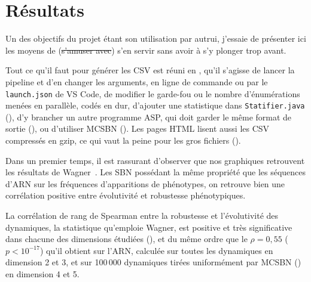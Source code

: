 \documentclass[12pt, a4paper]{article}
\begin{document}
\section{Résultats}
\label{sec:observations}

Un des objectifs du projet étant son utilisation par autrui, j'essaie de présenter ici les moyens de (\sout{s'amuser avec}) s'en servir sans avoir à s'y plonger trop avant. 

Tout ce qu'il faut pour générer les CSV est réuni en , qu'il s'agisse de lancer la pipeline et d'en changer les arguments, en ligne de commande ou par le \texttt{launch.json} de VS Code, de modifier le garde-fou ou le nombre d'énumérations menées en parallèle, codés en dur, d'ajouter une statistique dans \texttt{Statifier.java} (), d'y brancher un autre programme ASP, qui doit garder le même format de sortie (), ou d'utiliser MCSBN ().
Les pages HTML lisent aussi les CSV compressés en gzip, ce qui vaut la peine pour les gros fichiers ().


Dans un premier temps, il est rassurant d'observer que nos graphiques retrouvent les résultats de Wagner~\cite{wagner2008}. Les SBN possédant la même propriété que les séquences d'ARN sur les fréquences d'apparitions de phénotypes, on retrouve bien une corrélation positive entre évolutivité et robustesse phénotypiques. 

La corrélation de rang de Spearman entre la robustesse et l'évolutivité des dynamiques, la statistique qu'emploie Wagner, est positive et très significative dans chacune des dimensions étudiées (), et du même ordre que le $\rho = 0{,}55$ ($p < 10^{-17}$) qu'il obtient sur l'ARN, calculée sur toutes les dynamiques en dimension 2 et 3, et sur 100\,000 dynamiques tirées uniformément par MCSBN () en dimension 4 et 5.
\end{document}
